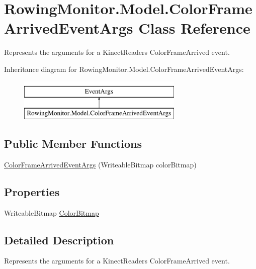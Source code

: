 \hypertarget{class_rowing_monitor_1_1_model_1_1_color_frame_arrived_event_args}{}\section{Rowing\+Monitor.\+Model.\+Color\+Frame\+Arrived\+Event\+Args Class Reference}
\label{class_rowing_monitor_1_1_model_1_1_color_frame_arrived_event_args}


Represents the arguments for a Kinect\+Reader\textquotesingle{}s Color\+Frame\+Arrived event.  


Inheritance diagram for Rowing\+Monitor.\+Model.\+Color\+Frame\+Arrived\+Event\+Args\+:\begin{figure}[H]
\begin{center}
\leavevmode
\includegraphics[height=2.000000cm]{class_rowing_monitor_1_1_model_1_1_color_frame_arrived_event_args}
\end{center}
\end{figure}
\subsection*{Public Member Functions}
\begin{DoxyCompactItemize}
\item 
\hyperlink{class_rowing_monitor_1_1_model_1_1_color_frame_arrived_event_args_a228785b0fda3657a17d7c30fd429ba1c}{Color\+Frame\+Arrived\+Event\+Args} (Writeable\+Bitmap color\+Bitmap)
\end{DoxyCompactItemize}
\subsection*{Properties}
\begin{DoxyCompactItemize}
\item 
Writeable\+Bitmap \hyperlink{class_rowing_monitor_1_1_model_1_1_color_frame_arrived_event_args_a2332327334320a56103d13596128a841}{Color\+Bitmap}
\end{DoxyCompactItemize}


\subsection{Detailed Description}
Represents the arguments for a Kinect\+Reader\textquotesingle{}s Color\+Frame\+Arrived event. 



